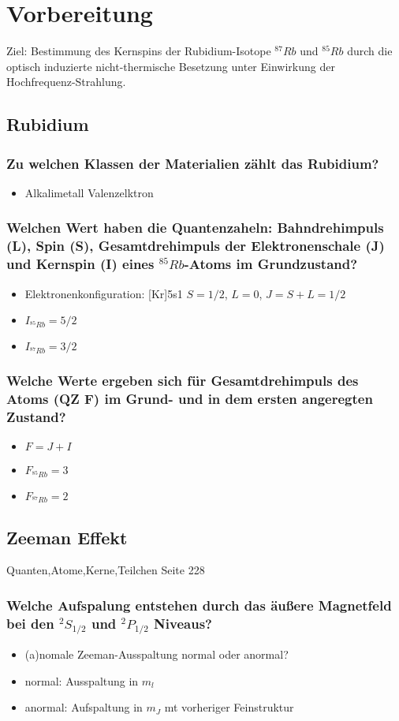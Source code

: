 \section{Vorbereitung}
Ziel: Bestimmung des Kernspins der Rubidium-Isotope $^{87}Rb$ und $^{85}Rb$ durch die optisch induzierte nicht-thermische Besetzung unter
Einwirkung der Hochfrequenz-Strahlung. 

\subsection{Rubidium}
\subsubsection[]{Zu welchen Klassen der Materialien zählt das Rubidium?}
\begin{itemize}
    \item Alkalimetall
     Valenzelktron
\end{itemize}
\subsubsection[]{Welchen Wert haben die Quantenzaheln: Bahndrehimpuls (L), Spin (S), Gesamtdrehimpuls der Elektronenschale (J) und Kernspin (I) eines $^{85}Rb$-Atoms im Grundzustand?}
\begin{itemize}
    \item Elektronenkonfiguration: [Kr]5s1
    \to $S=1/2$, $L=0$, $J=S+L=1/2$
    \item $I_{^{85}Rb}=5/2$
    \item $I_{^{87}Rb}=3/2$
\end{itemize}
\subsubsection[]{Welche Werte ergeben sich für Gesamtdrehimpuls des Atoms (QZ F) im Grund- und in dem ersten angeregten Zustand?}
\begin{itemize}
    \item $F=J+I$
    \item $F_{^{85}Rb}=3$
    \item $F_{^{87}Rb}=2$
\end{itemize}

\subsection{Zeeman Effekt}
Quanten,Atome,Kerne,Teilchen Seite 228
\subsubsection[]{Welche Aufspalung entstehen durch das äußere Magnetfeld bei den $^2S_{1/2}$ und $^2P_{1/2}$ Niveaus?}
\begin{itemize}
    \item (a)nomale Zeeman-Ausspaltung
    \to normal oder anormal?
    \item normal: Ausspaltung in $m_l$
    \item anormal: Aufspaltung in $m_J$ mt vorheriger Feinstruktur
\end{itemize}
